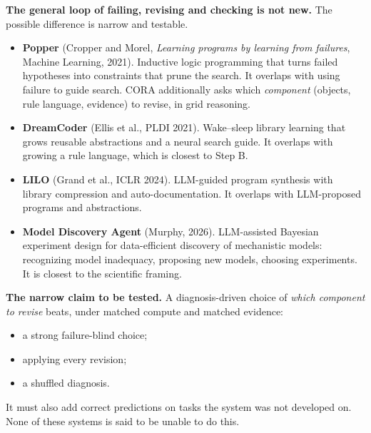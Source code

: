 \documentclass[11pt]{article}
\newcommand{\page}[1]{\clearpage{\Large\bfseries #1}\par\vspace{0.2em}}
\begin{document}
\page{9. Where this sits in prior work}
\textbf{The general loop of failing, revising and checking is not new.} The possible difference is narrow and testable.
\begin{itemize}
  \item \textbf{Popper} (Cropper and Morel, \emph{Learning programs by learning from failures}, Machine Learning,
        2021). Inductive logic programming that turns failed hypotheses into constraints that prune the search. It
        overlaps with using failure to guide search. CORA additionally asks which \emph{component} (objects, rule
        language, evidence) to revise, in grid reasoning.
  \item \textbf{DreamCoder} (Ellis et al., PLDI 2021). Wake--sleep library learning that grows reusable abstractions
        and a neural search guide. It overlaps with growing a rule language, which is closest to Step B.
  \item \textbf{LILO} (Grand et al., ICLR 2024). LLM-guided program synthesis with library compression and
        auto-documentation. It overlaps with LLM-proposed programs and abstractions.
  \item \textbf{Model Discovery Agent} (Murphy, 2026). LLM-assisted Bayesian experiment design for data-efficient
        discovery of mechanistic models: recognizing model inadequacy, proposing new models, choosing experiments. It
        is closest to the scientific framing.
\end{itemize}
\textbf{The narrow claim to be tested.} A diagnosis-driven choice of \emph{which component to revise} beats, under
matched compute and matched evidence:
\begin{itemize}
  \item a strong failure-blind choice;
  \item applying every revision;
  \item a shuffled diagnosis.
\end{itemize}
It must also add correct predictions on tasks the system was not developed on. None of these systems is said to be
unable to do this.
\end{document}
